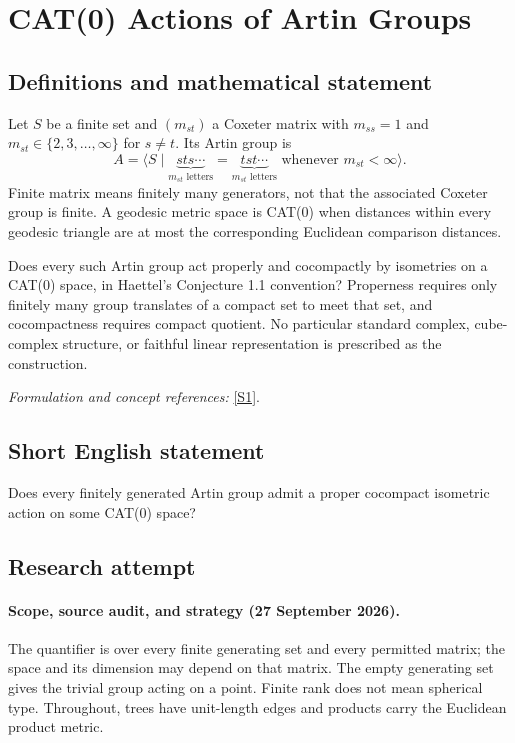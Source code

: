 \documentclass[11pt]{article}
\begin{document}
\section*{\texorpdfstring{CAT(0) Actions of Artin Groups}{CAT(0) Actions of Artin Groups}}\label{statement}
\subsection{Definitions and mathematical statement}
Let $S$ be a finite set and $(m_{st})$ a Coxeter matrix with $m_{ss}=1$ and $m_{st}\in\{2,3,\ldots,\infty\}$ for $s\ne t$. Its Artin group is
\[
 A=\langle S\mid
 \underbrace{sts\cdots}_{m_{st}\text{ letters}}=
 \underbrace{tst\cdots}_{m_{st}\text{ letters}}
 \text{ whenever }m_{st}<\infty\rangle.
\]
Finite matrix means finitely many generators, not that the associated Coxeter group is finite. A geodesic metric space is CAT(0) when distances within every geodesic triangle are at most the corresponding Euclidean comparison distances.

Does every such Artin group act properly and cocompactly by isometries on a CAT(0) space, in Haettel's Conjecture 1.1 convention? Properness requires only finitely many group translates of a compact set to meet that set, and cocompactness requires compact quotient. No particular standard complex, cube-complex structure, or faithful linear representation is prescribed as the construction.
\par\smallskip\textit{Formulation and concept references:} \href{https://www.numdam.org/item/10.5802/aif.3524.pdf}{[S1]}.

\subsection{Short English statement}
Does every finitely generated Artin group admit a proper cocompact isometric action on some CAT(0) space?
\subsection{Research attempt}

\paragraph{Scope, source audit, and strategy (27 September 2026).}
The quantifier is over every finite generating set and every permitted matrix;
the space and its dimension may depend on that matrix. The empty generating
set gives the trivial group acting on a point. Finite rank does not mean
spherical type. Throughout, trees have unit-length edges and products carry
the Euclidean product metric.
\end{document}
